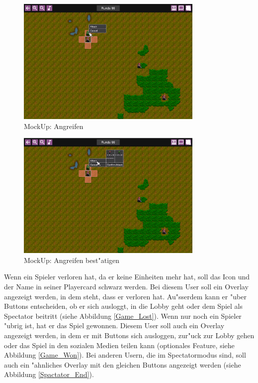 \documentclass[12pt, titlepage]{scrartcl}
\newcounter{subsubsubsection}[subsubsection]
\begin{document}
			        \begin{figure}[H] 
    				    \centering
    				    \includegraphics[width=0.8\textwidth]{images/mockUps/Attack.png}
    				    \caption{MockUp: Angreifen}
    				    \label{Attack}
			        \end{figure}
			        \begin{figure}[H] 
    				    \centering
    				    \includegraphics[width=0.8\textwidth]{images/mockUps/ConfirmAttack.png}
    				    \caption{MockUp: Angreifen best"atigen}
    				    \label{Attack_Confirm}
			        \end{figure}
			        Wenn ein Spieler verloren hat, da er keine Einheiten mehr hat, soll das Icon und der Name in seiner Playercard schwarz werden. Bei diesem User soll ein Overlay angezeigt werden, in dem steht, dass er verloren hat. Au"sserdem kann er "uber Buttons entscheiden, ob er sich ausloggt, in die Lobby geht oder dem Spiel als Spectator beitritt (siehe Abbildung \ref{Game_Lost}). Wenn nur noch ein Spieler "ubrig ist, hat er das Spiel gewonnen. Diesem User soll auch ein Overlay angezeigt werden, in dem er mit Buttons sich ausloggen, zur"uck zur Lobby gehen oder das Spiel in den sozialen Medien teilen kann (optionales Feature, siehe Abbildung \ref{Game_Won}). Bei anderen Usern, die im Spectatormodus sind, soll auch ein "ahnliches Overlay mit den gleichen Buttons angezeigt werden (siehe Abbildung \ref{Spactator_End}).
\end{document}
